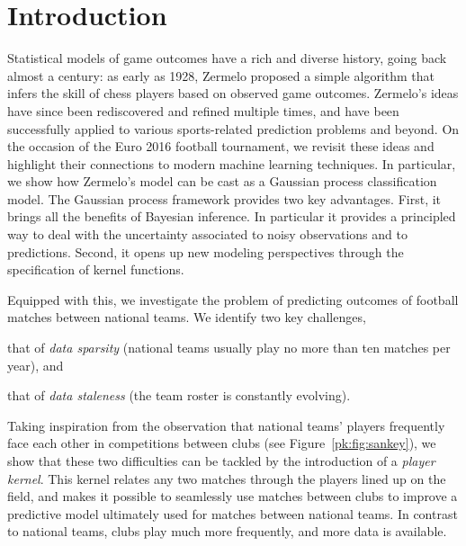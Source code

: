 \section{Introduction}
\label{pk:sec:intro}


Statistical models of game outcomes have a rich and diverse history, going back almost a century:
as early as 1928, Zermelo \cite{zermelo1928berechnung} proposed a simple algorithm that infers the skill of chess players based on observed game outcomes.
Zermelo's ideas have since been rediscovered and refined multiple times, and have been successfully applied to various sports-related prediction problems and beyond.
On the occasion of the Euro 2016 football tournament, we revisit these ideas and highlight their connections to modern machine learning techniques.
In particular, we show how Zermelo's model can be cast as a Gaussian process classification model.
The Gaussian process framework provides two key advantages.
First, it brings all the benefits of Bayesian inference. In particular it provides a principled way to deal with the uncertainty associated to noisy observations and to predictions.
Second, it opens up new modeling perspectives through the specification of kernel functions.

Equipped with this, we investigate the problem of predicting outcomes of football matches between national teams.
We identify two key challenges,
\begin{enuminline}
\item that of \emph{data sparsity} (national teams usually play no more than ten matches per year), and
\item that of \emph{data staleness} (the team roster is constantly evolving).
\end{enuminline}
Taking inspiration from the observation that national teams' players frequently face each other in competitions between clubs (see Figure~\ref{pk:fig:sankey}), we show that these two difficulties can be tackled by the introduction of a \emph{player kernel}.
This kernel relates any two matches through the players lined up on the field, and makes it possible to seamlessly use matches between clubs to improve a predictive model ultimately used for matches between national teams.
In contrast to national teams, clubs play much more frequently, and more data is available.

